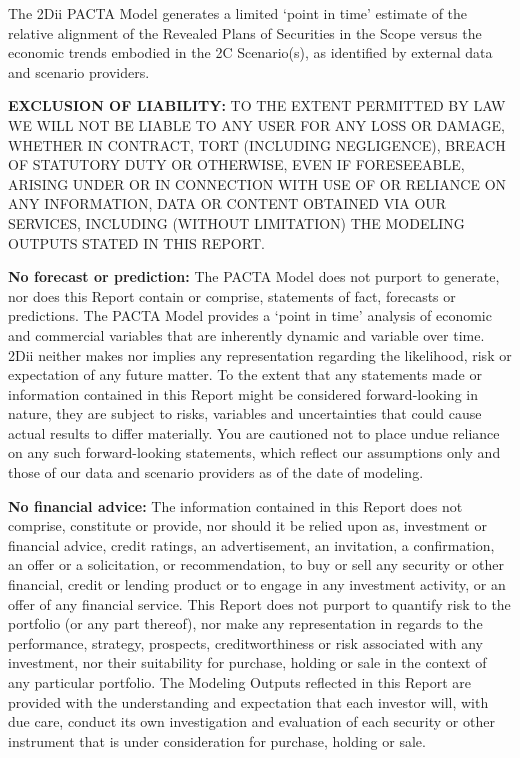 \documentclass[10pt,table,a4]{article}\usepackage[]{graphicx}\usepackage[]{color}
\begin{document}
	
	The 2Dii PACTA Model generates a limited `point in time' estimate of the relative alignment of the Revealed Plans of Securities in the Scope versus the economic trends embodied in the 2C Scenario(s), as identified by external data and scenario providers. 
	
	\textbf{EXCLUSION OF LIABILITY: }TO THE EXTENT PERMITTED BY LAW WE WILL NOT BE LIABLE TO ANY USER FOR ANY LOSS OR DAMAGE, WHETHER IN CONTRACT, TORT (INCLUDING NEGLIGENCE), BREACH OF STATUTORY DUTY OR OTHERWISE, EVEN IF FORESEEABLE, ARISING UNDER OR IN CONNECTION WITH USE OF OR RELIANCE ON ANY INFORMATION, DATA OR CONTENT OBTAINED VIA OUR SERVICES, INCLUDING (WITHOUT LIMITATION) THE MODELING OUTPUTS STATED IN THIS REPORT.
	
	\textbf{No forecast or prediction: }The PACTA Model does not purport to generate, nor does this Report contain or comprise, statements of fact, forecasts or predictions. The PACTA Model provides a `point in time' analysis of economic and commercial variables that are inherently dynamic and variable over time. 2Dii neither makes nor implies any representation regarding the likelihood, risk or expectation of any future matter. To the extent that any statements made or information contained in this Report might be considered forward-looking in nature, they are subject to risks, variables and uncertainties that could cause actual results to differ materially. You are cautioned not to place undue reliance on any such forward-looking statements, which reflect our assumptions only and those of our data and scenario providers as of the date of modeling.
	
	\textbf{No financial advice: }The information contained in this Report does not comprise, constitute or provide, nor should it be relied upon as, investment or financial advice, credit ratings, an advertisement, an invitation, a confirmation, an offer or a solicitation, or recommendation, to buy or sell any security or other financial, credit or lending product or to engage in any investment activity, or an offer of any financial service. This Report does not purport to quantify risk to the portfolio (or any part thereof), nor make any representation in regards to the performance, strategy, prospects, creditworthiness or risk associated with any investment, nor their suitability for purchase, holding or sale in the context of any particular portfolio. The Modeling Outputs reflected in this Report are provided with the understanding and expectation that each investor will, with due care, conduct its own investigation and evaluation of each security or other instrument that is under consideration for purchase, holding or sale. 
	
\end{document}
